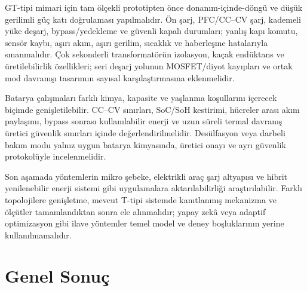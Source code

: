 GT-tipi mimari için tam ölçekli prototipten önce donanım-içinde-döngü ve düşük gerilimli güç katı doğrulaması yapılmalıdır. Ön şarj, PFC/CC--CV şarj, kademeli yüke deşarj, bypass/yedekleme ve güvenli kapalı durumları; yanlış kapı komutu, sensör kaybı, aşırı akım, aşırı gerilim, sıcaklık ve haberleşme hatalarıyla sınanmalıdır. Çok sekonderli transformatörün izolasyon, kaçak endüktans ve üretilebilirlik özellikleri; seri deşarj yolunun MOSFET/diyot kayıpları ve ortak mod davranışı tasarımın sayısal karşılaştırmasına eklenmelidir.

Batarya çalışmaları farklı kimya, kapasite ve yaşlanma koşullarını içerecek biçimde genişletilebilir. CC--CV sınırları, SoC/SoH kestirimi, hücreler arası akım paylaşımı, bypass sonrası kullanılabilir enerji ve uzun süreli termal davranış üretici güvenlik sınırları içinde değerlendirilmelidir. Desülfasyon veya darbeli bakım modu yalnız uygun batarya kimyasında, üretici onayı ve ayrı güvenlik protokolüyle incelenmelidir.

Son aşamada yöntemlerin mikro şebeke, elektrikli araç şarj altyapısı ve hibrit yenilenebilir enerji sistemi gibi uygulamalara aktarılabilirliği araştırılabilir. Farklı topolojilere genişletme, mevcut T-tipi sistemde kanıtlanmış mekanizma ve ölçütler tamamlandıktan sonra ele alınmalıdır; yapay zekâ veya adaptif optimizasyon gibi ilave yöntemler temel model ve deney boşluklarının yerine kullanılmamalıdır.


\section{Genel Sonuç}

